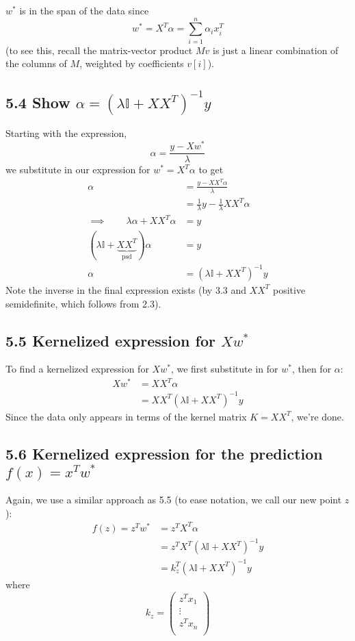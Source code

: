 \documentclass[paper=a4, fontsize=11pt]{scrartcl} %
\numberwithin{equation}{section} %
\numberwithin{figure}{section} %
\numberwithin{table}{section} %
\begin{document}
$w^*$ is in the span of the data since
\[w^* = X^T \alpha = \sum_{i = 1}^n \alpha_i x_i^T\]
(to see this, recall the matrix-vector product $Mv$ is just a linear combination of the columns of $M$, weighted by coefficients $v[i]$).  

\subsection*{5.4 Show $\alpha = (\lambda \mathbb{I} + XX^T)^{-1}y$}

Starting with the expression, 
\[\alpha =  \frac{y - Xw^*}{\lambda}\]
we substitute in our expression for $w^* =  X^T\alpha$ to get
\begin{align*}
\alpha &= \frac{y - XX^T\alpha}{\lambda}\\
	&= \frac{1}{\lambda} y  -  \frac{1}{\lambda} XX^T\alpha \\
\implies \qquad{} \lambda \alpha + XX^T\alpha &= y \\ 
(\lambda \mathbb{I} + \underbrace{XX^T}_{\textrm{psd}}) \alpha &= y \\ 
\alpha &= (\lambda \mathbb{I} + XX^T)^{-1}y
\end{align*}
 Note the inverse in the final expression exists (by 3.3 and $XX^T$ positive semidefinite, which follows from 2.3).

\subsection*{5.5 Kernelized expression for $Xw^*$}

To find a kernelized expression for $Xw^*$, we first substitute in for $w^*$, then for $\alpha$:
\begin{align*}
Xw^* &= XX^T\alpha \\
	&= XX^T (\lambda \mathbb{I} + XX^T)^{-1}y
\end{align*}
Since the data only appears in terms of the kernel matrix $K = XX^T$, we're done.

\subsection*{5.6 Kernelized expression for the prediction $f(x) = x^Tw^*$}

Again, we use a similar approach as 5.5 (to ease notation, we call our new point $z$):
\begin{align*}
f(z)=z^Tw^* &= z^TX^T\alpha \\
	&= z^TX^T (\lambda \mathbb{I} + XX^T)^{-1}y \\
	&= k_z^T (\lambda \mathbb{I} + XX^T)^{-1}y
\end{align*}
where
\[k_z =
\left(
\begin{matrix}
z^Tx_1 \\
\vdots \\
z^Tx_n \\
\end{matrix}
\right)
\]
\end{document}
